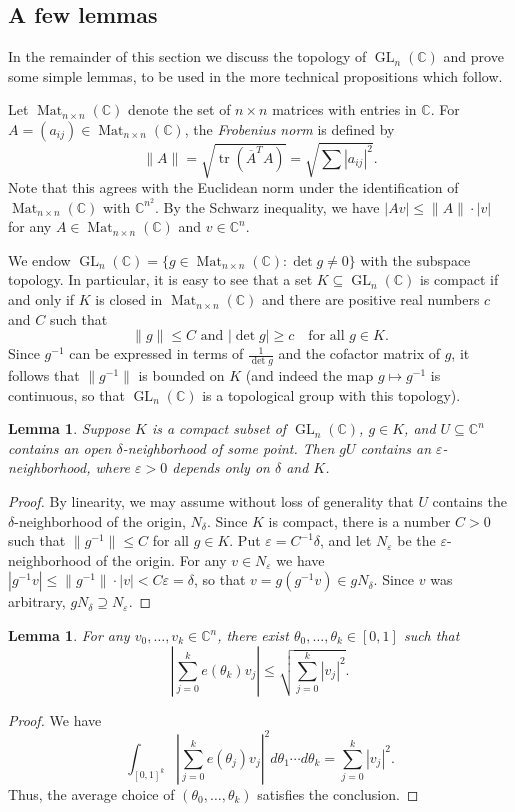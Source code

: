 \documentclass[11pt]{amsart}
\newtheorem{lemma}[theorem]{Lemma}
\theoremstyle{remark}
\numberwithin{theorem}{section}
\numberwithin{equation}{section}
\newcommand{\C}{\mathbb{C}}
\DeclareMathOperator{\GL}{GL}
\DeclareMathOperator{\tr}{tr}
\DeclareMathOperator{\Mat}{Mat}
\begin{document}
\subsection{A few lemmas}
In the remainder of this section we discuss the topology of $\GL_n(\C)$
and prove some simple lemmas, to be used in the more technical
propositions which follow.

Let $\Mat_{n\times n}(\C)$ denote the set of $n\times n$ matrices with
entries in $\C$. For $A=(a_{ij})\in\Mat_{n\times n}(\C)$,
the {\itshape Frobenius norm} is defined by
\[
\|A\|=\sqrt{\tr\left(\overline{A}^T A\right)}=\sqrt{\sum|a_{ij}|^2}.
\]
Note that this agrees with the Euclidean norm under the identification
of $\Mat_{n\times n}(\C)$ with $\C^{n^2}$.
By the Schwarz inequality, we have
$|Av|\le\|A\|\cdot|v|$ for any $A\in\Mat_{n\times n}(\C)$ and $v\in\C^n$.

We endow $\GL_n(\C)=\{g\in\Mat_{n\times n}(\C):\det{g}\ne0\}$
with the subspace topology. In particular,
it is easy to see that a set $K\subseteq\GL_n(\C)$ is
compact if and only if $K$ is closed in $\Mat_{n\times n}(\C)$
and there are positive real numbers $c$ and $C$ such that
$$
\|g\|\le C\text{ and }|\det{g}|\ge c
\quad\text{for all }g\in K.
$$
Since $g^{-1}$ can be expressed in terms of $\frac1{\det{g}}$ and the
cofactor matrix of $g$, it follows that $\|g^{-1}\|$ is bounded on $K$
(and indeed the map $g\mapsto g^{-1}$ is continuous, so that
$\GL_n(\C)$ is a topological group with this topology).

\begin{lemma}
Suppose $K$ is a compact subset of $\GL_n(\C)$, $g\in K$,
and $U\subseteq\C^n$ contains an open $\delta$-neighborhood of some
point.  Then $gU$ contains an $\varepsilon$-neighborhood,
where $\varepsilon > 0$ depends only on $\delta$ and $K$.
\end{lemma}\label{lem:nbhd_stability}
\begin{proof}
By linearity, we may assume without loss of generality that $U$ contains
the $\delta$-neighborhood of the origin, $N_\delta$. Since $K$ is
compact, there is a number $C>0$ such that $\|g^{-1}\|\le C$ for all
$g\in K$.  Put $\varepsilon=C^{-1}\delta$, and let $N_\varepsilon$ be the
$\varepsilon$-neighborhood of the origin. For any $v\in N_\varepsilon$
we have $|g^{-1}v|\le\|g^{-1}\|\cdot|v|<C\varepsilon=\delta$, so that
$v=g(g^{-1}v)\in gN_\delta$. Since $v$ was arbitrary, $gN_\delta\supseteq
N_\varepsilon$.
\end{proof}

\begin{lemma}\label{lem:sq_root_avg}
For any $v_0, \ldots, v_k \in \C^n$, there exist
$\theta_0, \ldots, \theta_k \in [0, 1]$ such that
\[
\left| \sum_{j = 0}^k e(\theta_k) v_j\right| \leq \sqrt{\sum_{j=0}^k|v_j|^2}.
\]
\end{lemma}
\begin{proof}
We have
\[
\int_{[0, 1]^k}\left|\sum_{j=0}^k e(\theta_j) v_j\right|^2
d\theta_1\cdots d\theta_k = \sum_{j=0}^{k}|v_j|^2.
\]
Thus, the average choice of $(\theta_0,\ldots,\theta_k)$ satisfies the
conclusion.
\end{proof}
\end{document}
